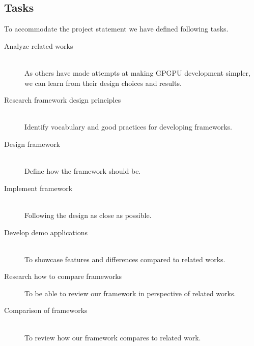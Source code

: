 \subsection{Tasks} \label{cha:tasks}
To accommodate the project statement we have defined following tasks.
\begin{description}
\item[Analyze related works] \hfill \\
As others have made attempts at making GPGPU development simpler, we can learn from their design choices and results.
\item[Research framework design principles] \hfill \\
Identify vocabulary and good practices for developing frameworks.
\item[Design framework] \hfill \\
Define how the framework should be.
\item[Implement framework] \hfill \\
Following the design as close as possible.
\item[Develop demo applications] \hfill \\
To showcase features and differences compared to related works.
\item[Research how to compare frameworks]
To be able to review our framework in perspective of related works.
\item[Comparison of frameworks] \hfill \\
To review how our framework compares to related work.
\end{description}
